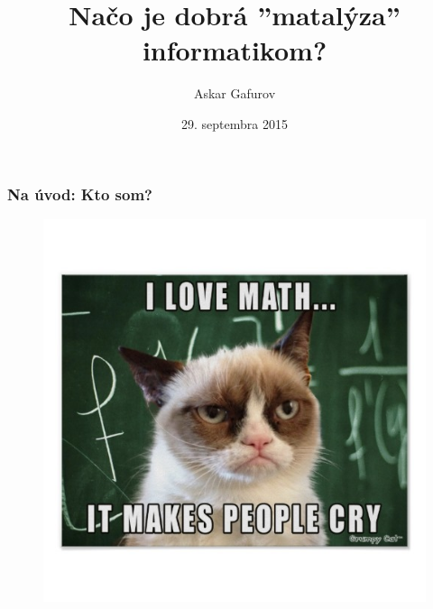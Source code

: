 \documentclass{beamer}
\title[Matalýza pre INF]{Načo je dobrá ''matalýza'' informatikom?} %
\author{Askar Gafurov} %
\institute[FMFI UK] %
{
Fakulta matematiky, fyziky a informatiky \\ %
Univerzita Komenského v Bratislave \\
\medskip
\textit{askar@ksp.sk} %
}
\date{29. septembra 2015} %
\begin{document}
\begin{frame}
\titlepage %
\end{frame}


 


\begin{frame}
\frametitle{Na úvod: Kto som?}
\begin{figure}
\includegraphics[height=0.8\textheight]{images/grumpy_cat.jpg}
\end{figure}
\end{frame}
\end{document}
